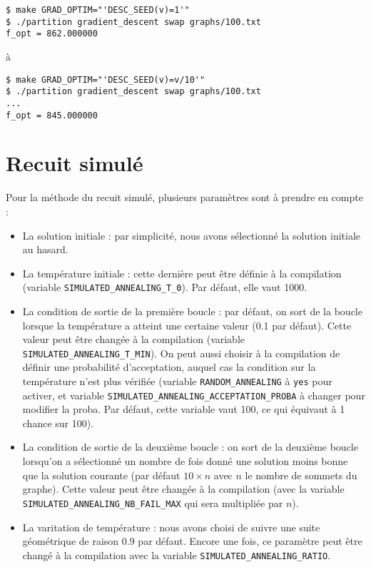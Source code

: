\documentclass[12pt, a4paper]{article}
\begin{document}
\begin{verbatim}
$ make GRAD_OPTIM="'DESC_SEED(v)=1'"
$ ./partition gradient_descent swap graphs/100.txt 
f_opt = 862.000000
\end{verbatim}
à
\begin{verbatim}
$ make GRAD_OPTIM="'DESC_SEED(v)=v/10'"
$ ./partition gradient_descent swap graphs/100.txt 
...
f_opt = 845.000000
\end{verbatim}



\section{Recuit simulé}
Pour la méthode du recuit simulé, plusieurs paramètres sont à prendre en compte :
\begin{itemize}
\item La solution initiale : par simplicité, nous avons sélectionné la solution initiale au hasard.
\item La température initiale : cette dernière peut être définie à la compilation (variable \texttt{SIMULATED\_ANNEALING\_T\_0}). Par défaut, elle vaut 1000.
\item La condition de sortie de la première boucle : par défaut, on sort de la boucle lorsque la température a atteint une certaine valeur (0.1 par défaut). Cette valeur peut être changée à la compilation (variable \texttt{SIMULATED\_ANNEALING\_T\_MIN}). On peut aussi choisir à la compilation de définir une probabilité d'acceptation, auquel cas la condition sur la température n'est plus vérifiée (variable \texttt{RANDOM\_ANNEALING} à \texttt{yes} pour activer, et variable \texttt{SIMULATED\_ANNEALING\_ACCEPTATION\_PROBA} à changer pour modifier la proba. Par défaut, cette variable vaut 100, ce qui équivaut à 1 chance sur 100).
\item La condition de sortie de la deuxième boucle : on sort de la deuxième boucle lorsqu'on a sélectionné un nombre de fois donné une solution moins bonne que la solution courante (par défaut $10 \times n$ avec $n$ le nombre de sommets du graphe). Cette valeur peut être changée à la compilation (avec la variable \texttt{SIMULATED\_ANNEALING\_NB\_FAIL\_MAX} qui sera multipliée par $n$).
\item La varitation de température : nous avons choisi de suivre une suite géométrique de raison $0.9$ par défaut. Encore une fois, ce paramètre peut être changé à la compilation avec la variable \texttt{SIMULATED\_ANNEALING\_RATIO}.
\end{itemize}
\end{document}
